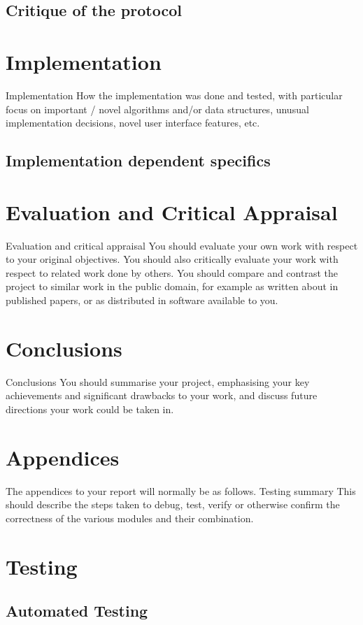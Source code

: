 \documentclass[11pt,a4paper,notitlepage]{report}
\begin{document}
	\subsection*{Critique of the protocol}
	\section*{Implementation}
	Implementation
	How the implementation was done and tested, with
	particular focus on important / novel algorithms
	and/or data structures, unusual implementation
	decisions, novel user interface features, etc.
	
	\subsection*{Implementation dependent specifics}
	
	\section*{Evaluation and Critical Appraisal}
	Evaluation and
	critical
	appraisal
	You should evaluate your own work with respect to
	your original objectives. You should also critically
	evaluate your work with respect to related work done
	by others. You should compare and contrast the project
	to similar work in the public domain, for example as
	written about in published papers, or as distributed in
	software available to you.
	
	\section*{Conclusions}
	Conclusions
	You should summarise your project, emphasising your
	key achievements and significant drawbacks to your
	work, and discuss future directions your work could be
	taken in.
	
	\section*{Appendices}
	The appendices to your report will normally be as follows.
	Testing
	summary
	This should describe the steps taken to debug, test,
	verify or otherwise confirm the correctness of the
	various modules and their combination.
	
	\section*{Testing}
	\subsection*{Automated Testing}
\end{document}
